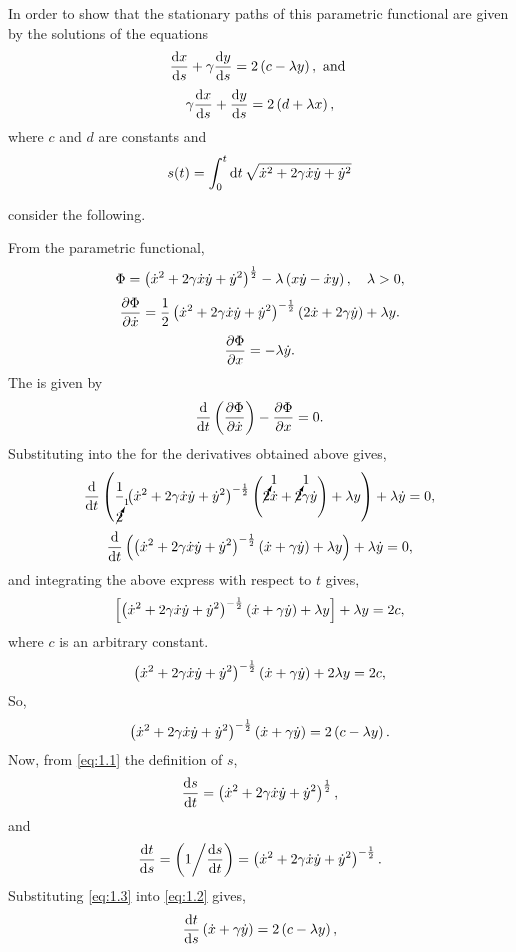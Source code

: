 In order to show that the stationary paths of this parametric functional are given by the solutions of the equations
\begin{equation*}
	\frac{\mathrm{d}x}{\mathrm{d}s} + \gamma\frac{\mathrm{d}y}{\mathrm{d}s} = 2\left(c - \lambda y\right), \textrm{ and }
\end{equation*}
\begin{equation*}
	\gamma\frac{\mathrm{d}x}{\mathrm{d}s} + \frac{\mathrm{d}y}{\mathrm{d}s} = 2\left(d + \lambda x\right),
\end{equation*}
where $c$ and $d$ are constants and
\begin{equation}
	\label{eq:1.1}
	s(t) = \int_{0}^{t}\mathrm{d} t\, \sqrt{\dot{x}^2 + 2\gamma\dot{x}\dot{y} + \dot{y}^2}
\end{equation}

consider the following.

From the parametric functional,
\[
	\Phi =\left(\dot{x}^2 + 2\gamma\dot{x}\dot{y} + \dot{y}^2\right)^{\frac{1}{2}} - \lambda\left(x\dot{y} - \dot{x} y\right),\quad \lambda > 0,
\]
\[
	\frac{\partial \Phi}{\partial \dot{x}} = \frac{1}{2}\left(\dot{x}^2 + 2\gamma\dot{x}\dot{y} + \dot{y}^2\right)^{-\frac{1}{2}}\left(2\dot{x} + 2\gamma\dot{y}\right) + \lambda y.
\]
\[
	\frac{\partial \Phi}{\partial x} = -\lambda\dot{y}.
\]
The \el is given by
\[
	\frac{\mathrm{d}}{\mathrm{d}t}\left(\frac{\partial \Phi}{\partial \dot{x}}\right)-\frac{\partial \Phi}{\partial x} = 0.
\]
Substituting into the \el for the derivatives obtained above gives,
\[
	\frac{\mathrm{d}}{\mathrm{d}t}\left(\frac{1}{\cancelto{1}{2}}\left(\dot{x}^2 + 2\gamma\dot{x}\dot{y} + \dot{y}^2\right)^{-\frac{1}{2}}\left(\cancelto{1}{2}\dot{x} + \cancelto{1}{2}\gamma\dot{y}\right) + \lambda y\right) + \lambda\dot{y} = 0,
\]
\[
	\frac{\mathrm{d}}{\mathrm{d}t}\left(\left(\dot{x}^2 + 2\gamma\dot{x}\dot{y} + \dot{y}^2\right)^{-\frac{1}{2}}\left(\dot{x} + \gamma\dot{y}\right) + \lambda y\right) + \lambda\dot{y} = 0,
\]
and integrating the above express with respect to $t$ gives,
\[
	\left[\left(\dot{x}^2 + 2\gamma\dot{x}\dot{y} + \dot{y}^2\right)^{-\frac{1}{2}}\left(\dot{x} + \gamma\dot{y}\right) + \lambda y\right] + \lambda y = 2c,
\]
where $c$ is an arbitrary constant.
\[
	\left(\dot{x}^2 + 2\gamma\dot{x}\dot{y} + \dot{y}^2\right)^{-\frac{1}{2}}\left(\dot{x} + \gamma\dot{y}\right) + 2 \lambda y = 2c,
\]
So,
\begin{equation}
	\label{eq:1.2}
	\left(\dot{x}^2 + 2\gamma\dot{x}\dot{y} + \dot{y}^2\right)^{-\frac{1}{2}}\left(\dot{x} + \gamma\dot{y}\right) = 2\left(c - \lambda y\right).
\end{equation}
Now, from \eqref{eq:1.1} the definition of $s$,
\begin{equation*}
	\frac{\mathrm{d}s}{\mathrm{d}t} = \left(\dot{x}^2 + 2\gamma\dot{x}\dot{y} + \dot{y}^2\right)^{\frac{1}{2}},
\end{equation*}
and
\begin{equation}
	\label{eq:1.3}
	\frac{\mathrm{d}t}{\mathrm{d}s} = \left( 1 \middle/ \frac{\mathrm{d}s}{\mathrm{d}t} \right) = \left(\dot{x}^2 + 2\gamma\dot{x}\dot{y} + \dot{y}^2\right)^{-\frac{1}{2}}.
\end{equation}
Substituting \eqref{eq:1.3} into \eqref{eq:1.2} gives,
\begin{equation*}
	\frac{\mathrm{d}t}{\mathrm{d}s}\left(\dot{x} + \gamma\dot{y}\right) = 2\left(c - \lambda y\right),
\end{equation*}
